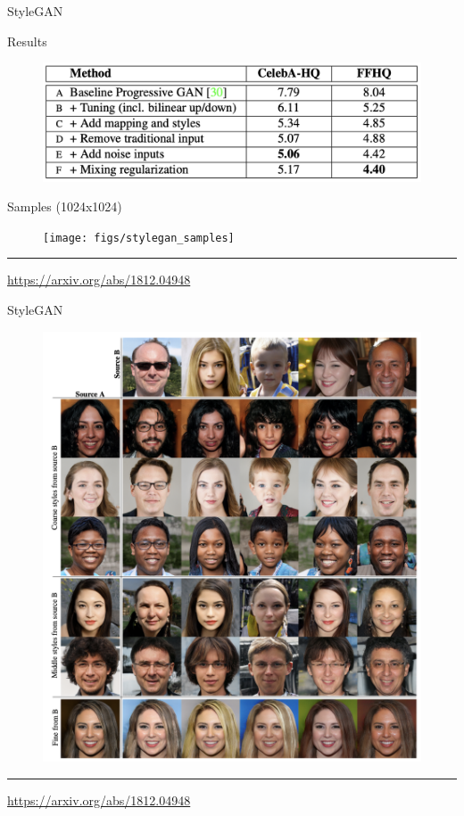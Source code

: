 \documentclass{beamer}
\begin{document}
\begin{frame}{StyleGAN}
	\begin{block}{Results}
		\vspace{-0.2cm}
		\begin{figure}
			\centering
			\includegraphics[width=0.6\linewidth]{figs/stylegan_results}
		\end{figure}
	\vspace{-0.3cm}
	\end{block}
	\begin{block}{Samples (1024x1024)}
		\begin{figure}
			\centering
			\texttt{[image: figs/stylegan\_samples]}
		\end{figure}
	\vspace{-0.1cm}
	\end{block}
	\vfill
	\hrule\medskip 
	{\scriptsize \href{https://arxiv.org/abs/1812.04948}{https://arxiv.org/abs/1812.04948}}
\end{frame}
\begin{frame}{StyleGAN}
		\begin{figure}
			\centering
			\includegraphics[width=0.6\linewidth]{figs/stylegan_mix}
		\end{figure}
	\vfill
	\hrule\medskip 
	{\scriptsize \href{https://arxiv.org/abs/1812.04948}{https://arxiv.org/abs/1812.04948}}
\end{frame}
\end{document}
